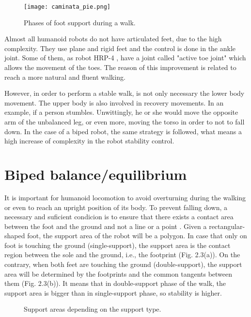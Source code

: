\begin{figure}[!hbt]
\centering
\texttt{[image: caminata\_pie.png]}
\caption{Phases of foot support during a walk.}
\label{fig:caminata_pie}
\end{figure}

Almost all humanoid robots do not have articulated feet, due to the high complexity. They use plane and rigid feet and the control is done in the ankle joint. Some of them, as robot HRP-4 \cite{Kan}, have a joint called "active toe joint" which allows the movement of the toes. The reason of this improvement is related to reach a more natural and fluent walking.

However, in order to perform a stable walk, is not only necessary the lower body movement. The upper body is also involved in recovery movements. In an example, if a person stumbles. Unwittingly, he or she would move the opposite arm of the unbalanced leg, or even more, moving the torso in order to not to fall down. In the case of a biped robot, the same strategy is followed, what means a high increase of complexity in the robot stability control.

\section{Biped balance/equilibrium}
It is important for humanoid locomotion to avoid overturning during the walking or even to reach an upright position of its body. To prevent falling down, a necessary and suficient condicion is to ensure that there exists a contact area between the foot and the ground and not a line or a point \cite{Vuk2007}. Given a rectangular-shaped foot, the support area of the robot will be a polygon. In case that only on foot is touching the ground (single-support), the support area is the contact region between the sole and the ground, i.e., the footprint (Fig. 2.3(a)). On the contrary, when both feet are touching the ground (double-support), the support area will be determined by the footprints and the common tangents between them (Fig. 2.3(b)). It means that in double-support phase of the walk, the support area is bigger than in single-support phase, so stability is higher.

\begin{figure}[!hbt]
\centering
{}
\hspace{10mm}
\caption{Support areas depending on the support type.}
\label{fig:apoyo}
\end{figure}


